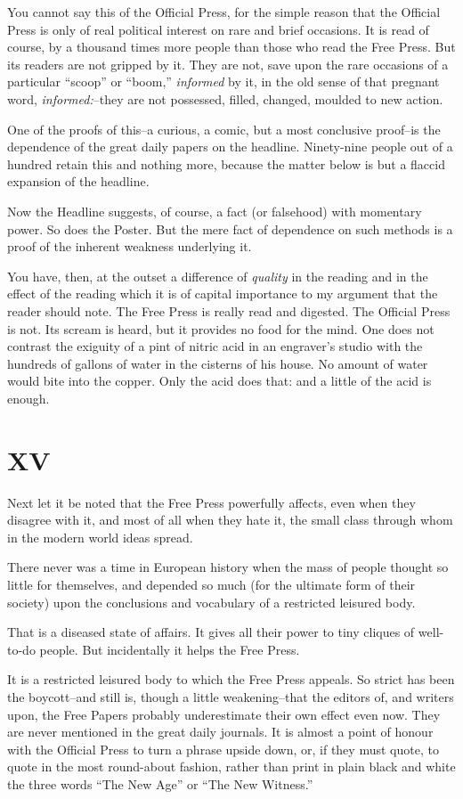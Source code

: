 \documentclass{book}
\begin{document}
You cannot say this of the Official Press, for the simple reason that the Official Press is only of real political interest on rare and brief occasions. It is read of course, by a thousand times more people than those who read the Free Press. But its readers are not gripped by it. They are not, save upon the rare occasions of a particular “scoop” or “boom,” \emph{informed} by it, in the old sense of that pregnant word, \emph{informed:}–they are not possessed, filled, changed, moulded to new action.

One of the proofs of this–a curious, a comic, but a most conclusive proof–is the dependence of the great daily papers on the headline. Ninety-nine people out of a hundred retain this and nothing more, because the matter below is but a flaccid expansion of the headline.

Now the Headline suggests, of course, a fact (or falsehood) with momentary power. So does the Poster. But the mere fact of dependence on such methods is a proof of the inherent weakness underlying it.

You have, then, at the outset a difference of \emph{quality} in the reading and in the effect of the reading which it is of capital importance to my argument that the reader should note. The Free Press is really read and digested. The Official Press is not. Its scream is heard, but it provides no food for the mind. One does not contrast the exiguity of a pint of nitric acid in an engraver’s studio with the hundreds of gallons of water in the cisterns of his house. No amount of water would bite into the copper. Only the acid does that: and a little of the acid is enough.

\chapter*{XV}
\label{chapter-16}
Next let it be noted that the Free Press powerfully affects, even when they disagree with it, and most of all when they hate it, the small class through whom in the modern world ideas spread.

There never was a time in European history when the mass of people thought so little for themselves, and depended so much (for the ultimate form of their society) upon the conclusions and vocabulary of a restricted leisured body.

That is a diseased state of affairs. It gives all their power to tiny cliques of well-to-do people. But incidentally it helps the Free Press.

It is a restricted leisured body to which the Free Press appeals. So strict has been the boycott–and still is, though a little weakening–that the editors of, and writers upon, the Free Papers probably underestimate their own effect even now. They are never mentioned in the great daily journals. It is almost a point of honour with the Official Press to turn a phrase upside down, or, if they must quote, to quote in the most round-about fashion, rather than print in plain black and white the three words “The New Age” or “The New Witness.”
\end{document}
